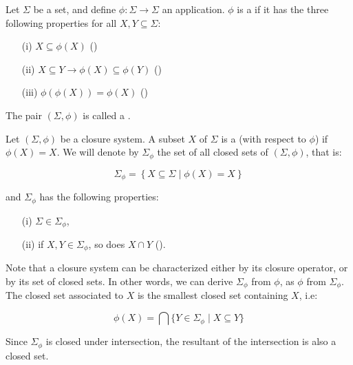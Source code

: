 \begin{definition} Let
$\Sigma$ be a set, and define $\phi : \Sigma \longrightarrow \Sigma$ an
application. $\phi$ is a  if it has the three following
properties for all $X, Y \subseteq \Sigma$:
\begin{itemize}
	\item[(i)] $X \subseteq \phi(X)$ ()
	\item[(ii)] $X \subseteq Y \longrightarrow \phi(X) \subseteq \phi(Y)$ 
		()
	\item[(iii)] $\phi(\phi(X)) = \phi(X)$ ()
\end{itemize}

\noindent The pair $(\Sigma, \phi)$ is called a .
	
\end{definition}


\begin{definition} Let $(\Sigma, \phi)$ be a closure 
system. A subset $X$ of $\Sigma$ is a  (with respect to 
$\phi$) if $\phi(X) = X$. We will denote by $\Sigma_{\phi}$ the set of all 
closed sets of $(\Sigma, \phi)$, that is:
	
	\[ \Sigma_{\phi} = \left\{ X \subseteq \Sigma \; | \; \phi(X) = X 
	\right\}  \]

\noindent and $\Sigma_{\phi}$ has the following properties:
\begin{itemize}
	\item[(i)] $\Sigma \in \Sigma_{\phi}$,
	\item[(ii)] if $X, Y \in \Sigma_{\phi}$, so does $X \cap Y$ 
		().
\end{itemize}
	
\end{definition}

\noindent Note that a closure system can be characterized either by its closure
operator, or by its set of closed sets. In other words, we can derive 
$\Sigma_{\phi}$ from $\phi$, as $\phi$ from $\Sigma_{\phi}$. The closed set 
associated to $X$ is the smallest closed set containing $X$, i.e:

	\[ \phi(X) = \bigcap \{Y \in \Sigma_\phi \; | \; X \subseteq Y \} \]

\noindent Since $\Sigma_{\phi}$ is closed under intersection, the resultant of
the intersection is also a closed set.


